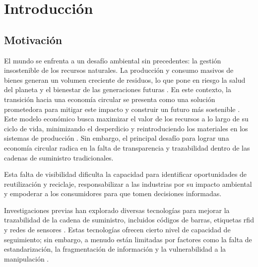 \chapter[Introducción]{Introducción}
\label{cp:introduction}

\parindent0pt

\section{Motivación}

El mundo se enfrenta a un desafío ambiental sin precedentes: la gestión insostenible de los recursos naturales. La producción y consumo masivos de bienes generan un volumen creciente de residuos, lo que pone en riesgo la salud del planeta y el bienestar de las generaciones futuras \cite{IPCC2022, pelegri2021ipcc}. En este contexto, la transición hacia una economía circular se presenta como una solución prometedora para mitigar este impacto y construir un futuro más sostenible \cite{clima2022book}. Este modelo económico busca maximizar el valor de los recursos a lo largo de su ciclo de vida, minimizando el desperdicio y reintroduciendo los materiales en los sistemas de producción \cite{da2022economia, melendez2021economia}. Sin embargo, el principal desafío para lograr una economía circular radica en la falta de transparencia y trazabilidad dentro de las cadenas de suministro tradicionales.

Esta falta de visibilidad dificulta la capacidad para identificar oportunidades de reutilización y reciclaje, responsabilizar a las industrias por su impacto ambiental y empoderar a los consumidores para que tomen decisiones informadas. 

Investigaciones previas han explorado diversas tecnologías para mejorar la trazabilidad de la cadena de suministro, incluidos códigos de barras, etiquetas \acrshort{rfid} y redes de sensores \cite{schuitemaker2020product}. Estas tecnologías ofrecen cierto nivel de capacidad de seguimiento; sin embargo, a menudo están limitadas por factores como la falta de estandarización, la fragmentación de información y la vulnerabilidad a la manipulación \cite{schuitemaker2020product}.

